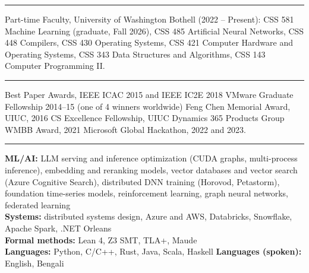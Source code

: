 \documentclass[11pt]{article}
\newcommand{\cvsec}[1]{\vspace{8pt}{\large\bfseries #1}\vspace{2pt}\hrule\vspace{4pt}\par}
\begin{document}
\cvsec{Teaching}
Part-time Faculty, University of Washington Bothell (2022 -- Present): CSS 581 Machine Learning (graduate, Fall 2026), CSS 485 Artificial Neural Networks, CSS 448 Compilers, CSS 430 Operating Systems, CSS 421 Computer Hardware and Operating Systems, CSS 343 Data Structures and Algorithms, CSS 143 Computer Programming II.

\cvsec{Honors \& Awards}
Best Paper Awards, IEEE ICAC 2015 and IEEE IC2E 2018 \textbar{} VMware Graduate Fellowship 2014--15 (one of 4 winners worldwide) \textbar{} Feng Chen Memorial Award, UIUC, 2016 \textbar{} CS Excellence Fellowship, UIUC \textbar{} Dynamics 365 Products Group WMBB Award, 2021 \textbar{} Microsoft Global Hackathon, 2022 and 2023.

\cvsec{Technical Skills}
\textbf{ML/AI:} LLM serving and inference optimization (CUDA graphs, multi-process inference), embedding and reranking models, vector databases and vector search (Azure Cognitive Search), distributed DNN training (Horovod, Petastorm), foundation time-series models, reinforcement learning, graph neural networks, federated learning\\
\textbf{Systems:} distributed systems design, Azure and AWS, Databricks, Snowflake, Apache Spark, .NET Orleans\\
\textbf{Formal methods:} Lean 4, Z3 SMT, TLA+, Maude\\
\textbf{Languages:} Python, C/C++, Rust, Java, Scala, Haskell \textbar{} \textbf{Languages (spoken):} English, Bengali
\end{document}
